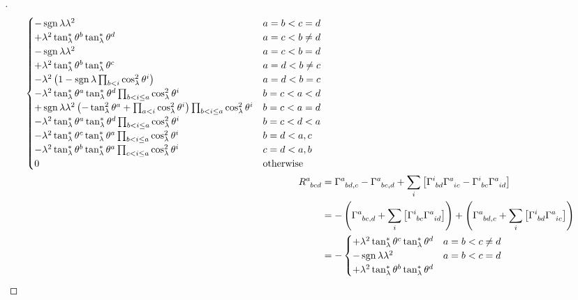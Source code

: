 \documentclass[../main.tex]{subfiles}
\begin{document}
\begin{proof}[]
\begin{align*}
\begin{cases}
-\sign{\lambda}\lambda^2
&\text{\(a=b<c=d\)}\\
+\lambda^2\tan_\lambda^\ast\tensor{\theta}{^b}\tan_\lambda^\ast\tensor{\theta}{^d}
&\text{\(a=c<b\ne d\)}\\
-\sign{\lambda}\lambda^2
&\text{\(a=c<b=d\)}\\
+\lambda^2\tan_\lambda^\ast\tensor{\theta}{^b}\tan_\lambda^\ast\tensor{\theta}{^c}
&\text{\(a=d<b\ne c\)}\\
-\lambda^2
\left(
1-\sign{\lambda}\prod_{b<i}\cos_\lambda^2\tensor{\theta}{^i}
\right)
&\text{\(a=d<b=c\)}\\
-\lambda^2\tan_\lambda^\ast\tensor{\theta}{^a}\tan_\lambda^\ast\tensor{\theta}{^d}\prod_{b<i\le a}\cos_\lambda^2\tensor{\theta}{^i}
&\text{\(b=c<a<d\)}\\
+\sign{\lambda}\lambda^2
\left(
-\tan_\lambda^2\tensor{\theta}{^a}
+\prod_{a<i}\cos_\lambda^2\tensor{\theta}{^i}
\right)
\prod_{b<i\le a}{\cos_\lambda^2\tensor{\theta}{^i}}
&\text{\(b=c<a=d\)}\\
-\lambda^2\tan_\lambda^\ast\tensor{\theta}{^a}\tan_\lambda^\ast\tensor{\theta}{^d}\prod_{b<i\le a}{\cos_\lambda^2\tensor{\theta}{^i}}
&\text{\(b=c<d<a\)}\\
-\lambda^2\tan_\lambda^\ast\tensor{\theta}{^c}\tan_\lambda^\ast\tensor{\theta}{^a}\prod_{b<i\le a}\cos_\lambda^2\tensor{\theta}{^i}
&\text{\(b=d<a,c\)}\\
-\lambda^2\tan_\lambda^\ast\tensor{\theta}{^b}\tan_\lambda^\ast\tensor{\theta}{^a}\prod_{c<i\le a}\cos_\lambda^2\tensor{\theta}{^i}
&\text{\(c=d<a,b\)}\\
0&\text{otherwise}\\
\end{cases}\\
\tensor{R}{^a_b_c_d}
&=
\tensor{\Gamma}{^a_b_d_{,c}}
-\tensor{\Gamma}{^a_b_c_{,d}}
+\sum_{i}\left[\tensor{\Gamma}{^i_b_d}\tensor{\Gamma}{^a_i_c}-\tensor{\Gamma}{^i_b_c}\tensor{\Gamma}{^a_i_d}\right]
\\
&=
-\left(
\tensor{\Gamma}{^a_b_c_{,d}}
+\sum_{i}\left[\tensor{\Gamma}{^i_b_c}\tensor{\Gamma}{^a_i_d}\right]
\right)
+\left(
\tensor{\Gamma}{^a_b_d_{,c}}
+\sum_{i}\left[\tensor{\Gamma}{^i_b_d}\tensor{\Gamma}{^a_i_c}\right]
\right)\\
&=-
\begin{cases}
+\lambda^2\tan_\lambda^\ast\tensor{\theta}{^c}\tan_\lambda^\ast\tensor{\theta}{^d}
&\text{\(a=b<c\ne d\)}\\
-\sign{\lambda}\lambda^2
&\text{\(a=b<c=d\)}\\
+\lambda^2\tan_\lambda^\ast\tensor{\theta}{^b}\tan_\lambda^\ast\tensor{\theta}{^d}

\end{cases}
\end{align*}
\end{proof}
\end{document}
